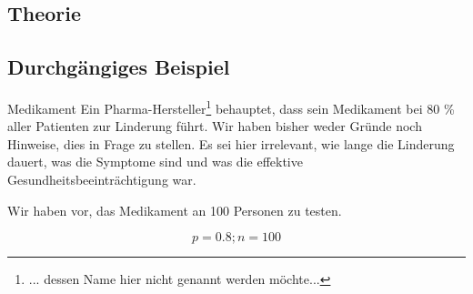 
\subsection{Theorie}

\subsection*{Durchgängiges Beispiel}

\begin{beispiel}{Medikament}{}
  Ein Pharma-Hersteller\footnote{... dessen Name hier nicht genannt
    werden möchte...} behauptet, dass sein Medikament bei 80 \% aller
  Patienten zur Linderung führt. Wir haben bisher weder Gründe noch Hinweise,
  dies in Frage zu stellen. Es sei hier irrelevant, wie lange die
  Linderung dauert, was die Symptome sind und was die effektive
  Gesundheitsbeeinträchtigung war.

  Wir haben vor, das Medikament an 100 Personen zu testen.

  $$p = 0.8; n=100$$
\end{beispiel}
\newpage







